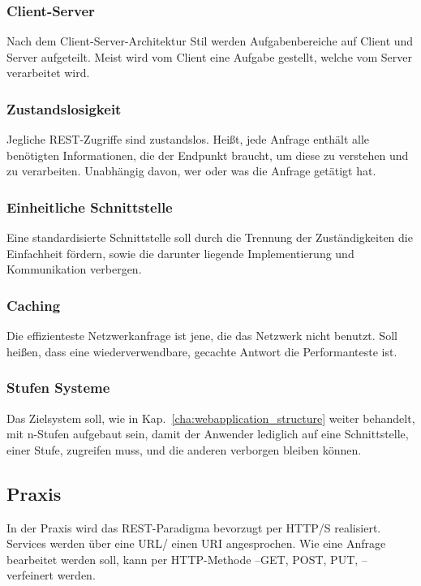 \subsubsection{Client-Server}
Nach dem Client-Server-Architektur Stil werden Aufgabenbereiche auf Client und Server aufgeteilt. Meist wird vom Client eine Aufgabe gestellt, welche vom Server verarbeitet wird. 
\subsubsection{Zustandslosigkeit}
Jegliche REST-Zugriffe sind zustandslos. Heißt, jede Anfrage enthält alle benötigten Informationen, die der Endpunkt braucht, um diese zu verstehen und zu verarbeiten. Unabhängig davon, wer oder was die Anfrage getätigt hat.  
\subsubsection{Einheitliche Schnittstelle}
Eine standardisierte Schnittstelle soll durch die Trennung der Zuständigkeiten die Einfachheit fördern, sowie die darunter liegende Implementierung und Kommunikation verbergen. 
\subsubsection{Caching}
Die effizienteste Netzwerkanfrage ist jene, die das Netzwerk nicht benutzt.
Soll heißen, dass eine wiederverwendbare, gecachte  Antwort die Performanteste ist. 
\subsubsection{Stufen Systeme}
Das Zielsystem soll, wie in Kap.~\ref{cha:webapplication_structure} weiter behandelt, mit n-Stufen aufgebaut sein, damit der Anwender lediglich auf eine Schnittstelle, einer Stufe, zugreifen muss, und die anderen verborgen bleiben können.

\subsection{Praxis}
In der Praxis wird das REST-Paradigma bevorzugt per HTTP/S realisiert. Services werden über eine URL/ einen URI angesprochen. Wie eine Anfrage bearbeitet werden soll, kann per HTTP-Methode --GET, POST, PUT, \etc -- verfeinert werden. 
